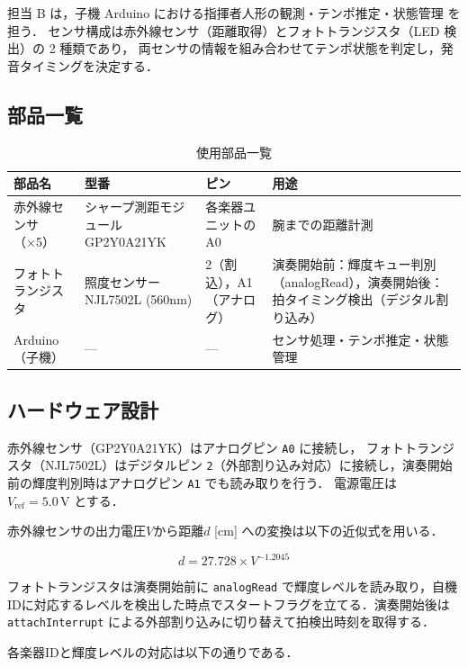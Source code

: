 \documentclass[lualatex,book,paper=a4paper,jafontsize=11.5pt,jafontscale=1.05,oneside]{jlreq}
\begin{document}
担当 B は，子機 Arduino における指揮者人形の観測・テンポ推定・状態管理 を担う．
センサ構成は赤外線センサ（距離取得）とフォトトランジスタ（LED 検出）の 2 種類であり，
両センサの情報を組み合わせてテンポ状態を判定し，発音タイミングを決定する．

\subsection{部品一覧}

\begin{table}[H]
\centering
\caption{使用部品一覧}
\begin{tabular}{p{4cm}p{6cm}p{2cm}p{3cm}}
\hline
\textbf{部品名} & \textbf{型番} & \textbf{ピン} & \textbf{用途} \\
\hline
赤外線センサ（×5） & シャープ測距モジュール GP2Y0A21YK & 各楽器ユニットのA0 & 腕までの距離計測 \\
\hline
フォトトランジスタ & 照度センサー NJL7502L (560nm) & 2（割込），A1（アナログ） & 演奏開始前：輝度キュー判別（analogRead），演奏開始後：拍タイミング検出（デジタル割り込み） \\
\hline
Arduino（子機） & — & — & センサ処理・テンポ推定・状態管理 \\
\hline
\end{tabular}
\end{table}

\subsection{ハードウェア設計}

赤外線センサ（GP2Y0A21YK）はアナログピン \texttt{A0} に接続し，
フォトトランジスタ（NJL7502L）はデジタルピン \texttt{2}（外部割り込み対応）に接続し，演奏開始前の輝度判別時はアナログピン \texttt{A1} でも読み取りを行う．
電源電圧は $V_{\text{ref}} = 5.0\,\text{V}$ とする．

赤外線センサの出力電圧$V$から距離$d$ [cm] への変換は以下の近似式を用いる．

\begin{equation}
  d = 27.728 \times V^{-1.2045}
\end{equation}

フォトトランジスタは演奏開始前に \texttt{analogRead} で輝度レベルを読み取り，自機IDに対応するレベルを検出した時点でスタートフラグを立てる．演奏開始後は \texttt{attachInterrupt} による外部割り込みに切り替えて拍検出時刻を取得する．

各楽器IDと輝度レベルの対応は以下の通りである．
\end{document}
